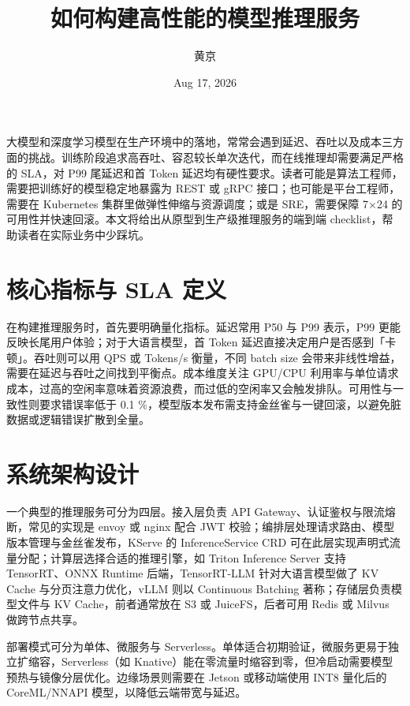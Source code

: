 \title{如何构建高性能的模型推理服务}
\author{黄京}
\date{Aug 17, 2026}
\maketitle
大模型和深度学习模型在生产环境中的落地，常常会遇到延迟、吞吐以及成本三方面的挑战。训练阶段追求高吞吐、容忍较长单次迭代，而在线推理却需要满足严格的 SLA，对 P99 尾延迟和首 Token 延迟均有硬性要求。读者可能是算法工程师，需要把训练好的模型稳定地暴露为 REST 或 gRPC 接口；也可能是平台工程师，需要在 Kubernetes 集群里做弹性伸缩与资源调度；或是 SRE，需要保障 7×24 的可用性并快速回滚。本文将给出从原型到生产级推理服务的端到端 checklist，帮助读者在实际业务中少踩坑。\par
\chapter{核心指标与 SLA 定义}
在构建推理服务时，首先要明确量化指标。延迟常用 P50 与 P99 表示，P99 更能反映长尾用户体验；对于大语言模型，首 Token 延迟直接决定用户是否感到「卡顿」。吞吐则可以用 QPS 或 Tokens/s 衡量，不同 batch size 会带来非线性增益，需要在延迟与吞吐之间找到平衡点。成本维度关注 GPU/CPU 利用率与单位请求成本，过高的空闲率意味着资源浪费，而过低的空闲率又会触发排队。可用性与一致性则要求错误率低于 0.1 \%{}，模型版本发布需支持金丝雀与一键回滚，以避免脏数据或逻辑错误扩散到全量。\par
\chapter{系统架构设计}
一个典型的推理服务可分为四层。接入层负责 API Gateway、认证鉴权与限流熔断，常见的实现是 envoy 或 nginx 配合 JWT 校验；编排层处理请求路由、模型版本管理与金丝雀发布，KServe 的 InferenceService CRD 可在此层实现声明式流量分配；计算层选择合适的推理引擎，如 Triton Inference Server 支持 TensorRT、ONNX Runtime 后端，TensorRT-LLM 针对大语言模型做了 KV Cache 与分页注意力优化，vLLM 则以 Continuous Batching 著称；存储层负责模型文件与 KV Cache，前者通常放在 S3 或 JuiceFS，后者可用 Redis 或 Milvus 做跨节点共享。\par
部署模式可分为单体、微服务与 Serverless。单体适合初期验证，微服务更易于独立扩缩容，Serverless（如 Knative）能在零流量时缩容到零，但冷启动需要模型预热与镜像分层优化。边缘场景则需要在 Jetson 或移动端使用 INT8 量化后的 CoreML/NNAPI 模型，以降低云端带宽与延迟。\par
